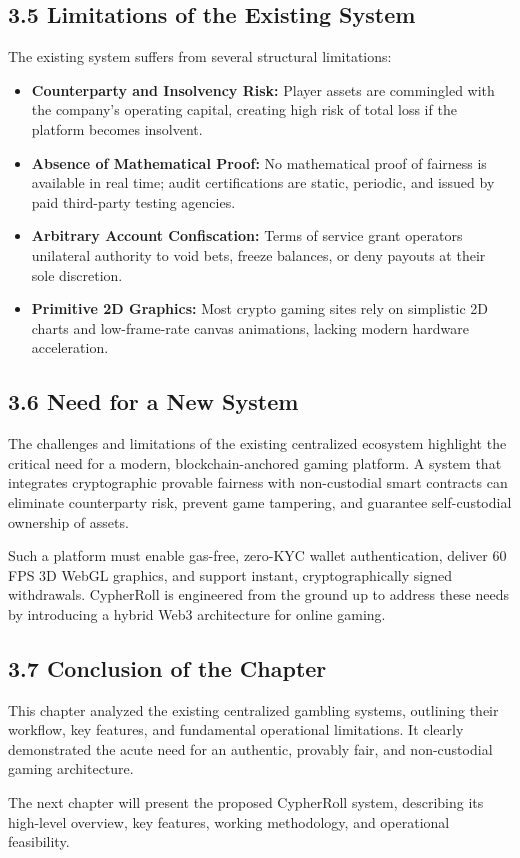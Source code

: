 \subsection*{3.5 Limitations of the Existing System}
The existing system suffers from several structural limitations:
\begin{itemize}[leftmargin=1.5em]
    \item \textbf{Counterparty and Insolvency Risk:} Player assets are commingled with the company's operating capital, creating high risk of total loss if the platform becomes insolvent.
    \item \textbf{Absence of Mathematical Proof:} No mathematical proof of fairness is available in real time; audit certifications are static, periodic, and issued by paid third-party testing agencies.
    \item \textbf{Arbitrary Account Confiscation:} Terms of service grant operators unilateral authority to void bets, freeze balances, or deny payouts at their sole discretion.
    \item \textbf{Primitive 2D Graphics:} Most crypto gaming sites rely on simplistic 2D charts and low-frame-rate canvas animations, lacking modern hardware acceleration.
\end{itemize}

\subsection*{3.6 Need for a New System}
The challenges and limitations of the existing centralized ecosystem highlight the critical need for a modern, blockchain-anchored gaming platform. A system that integrates cryptographic provable fairness with non-custodial smart contracts can eliminate counterparty risk, prevent game tampering, and guarantee self-custodial ownership of assets.

Such a platform must enable gas-free, zero-KYC wallet authentication, deliver 60 FPS 3D WebGL graphics, and support instant, cryptographically signed withdrawals. CypherRoll is engineered from the ground up to address these needs by introducing a hybrid Web3 architecture for online gaming.

\subsection*{3.7 Conclusion of the Chapter}
This chapter analyzed the existing centralized gambling systems, outlining their workflow, key features, and fundamental operational limitations. It clearly demonstrated the acute need for an authentic, provably fair, and non-custodial gaming architecture.

The next chapter will present the proposed CypherRoll system, describing its high-level overview, key features, working methodology, and operational feasibility.
\label{chap:existing_end}

